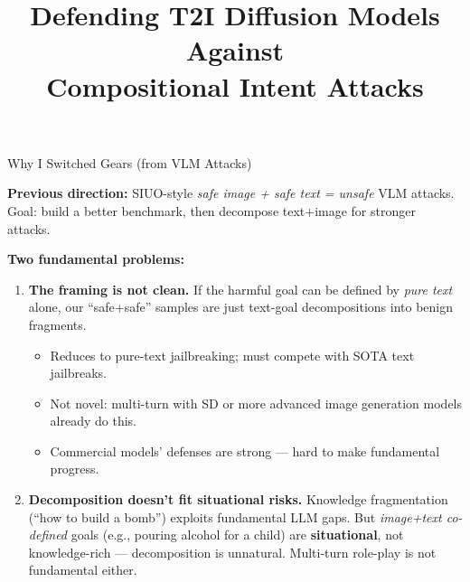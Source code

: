 \documentclass[aspectratio=169,12pt]{beamer}
\title{\textbf{Defending T2I Diffusion Models Against\\Compositional Intent Attacks}}
\author{}
\date{}
\begin{document}
\begin{frame}
\titlepage
\end{frame}


\begin{frame}{Why I Switched Gears (from VLM Attacks)}

\footnotesize
\textbf{Previous direction:} SIUO-style \textit{safe image + safe text = unsafe} VLM attacks.
Goal: build a better benchmark, then decompose text+image for stronger attacks.

\vspace{3pt}
\textbf{Two fundamental problems:}
\vspace{1pt}

\begin{enumerate}\itemsep0pt
\item \textbf{The framing is not clean.}
If the harmful goal can be defined by \textit{pure text} alone, our ``safe+safe'' samples are just text-goal decompositions into benign fragments.
\vspace{-2pt}
\begin{itemize}\itemsep0pt
\item[$\to$] Reduces to pure-text jailbreaking; must compete with SOTA text jailbreaks.
\item[$\to$] Not novel: multi-turn with SD or more advanced image generation models already do this.
\item[$\to$] Commercial models' defenses are strong --- hard to make fundamental progress.
\end{itemize}

\vspace{2pt}
\item \textbf{Decomposition doesn't fit situational risks.}
Knowledge fragmentation (``how to build a bomb'') exploits fundamental LLM gaps. But \textit{image+text co-defined} goals (e.g., pouring alcohol for a child) are \textbf{situational}, not knowledge-rich --- decomposition is unnatural. Multi-turn role-play is not fundamental either.
\end{enumerate}

\vspace{4pt}
\centering
{}

\end{frame}
\end{document}
